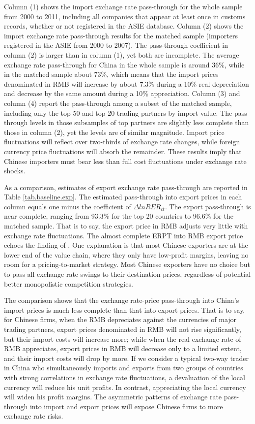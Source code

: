 Column (1) shows the import exchange rate pass-through for the whole sample from 2000 to 2011, including all companies that appear at least once in customs records, whether or not registered in the ASIE database. Column (2) shows the import exchange rate pass-through results for the matched sample (importers registered in the ASIE from 2000 to 2007). The pass-through coefficient in column (2) is larger than in column (1), yet both are incomplete. The average exchange rate pass-through for China in the whole sample is around 36\%, while in the matched sample about 73\%, which means that the import prices denominated in RMB will increase by about 7.3\% during a 10\% real depreciation and decrease by the same amount during a 10\% appreciation. Column (3) and column (4) report the pass-through among a subset of the matched sample, including only the top 50 and top 20 trading partners by import value. The pass-through levels in those subsamples of top partners are slightly less complete than those in column (2), yet the levels are of similar magnitude. Import price fluctuations will reflect over two-thirds of exchange rate changes, while foreign currency price fluctuations will absorb the remainder. These results imply that Chinese importers must bear less than full cost fluctuations under exchange rate shocks. 

As a comparison, estimates of export exchange rate pass-through are reported in Table \ref{tab.baseline.exp}. The estimated pass-through into export prices in each column equals one minus the coefficient of $\Delta lnRER_{ct}$. The export pass-through is near complete, ranging from 93.3\% for the top 20 countries to 96.6\% for the matched sample. That is to say, the export price in RMB adjusts very little with exchange rate fluctuations. The almost complete ERPT into RMB export price echoes the finding of \cite{lmx2015}. One explanation is that most Chinese exporters are at the lower end of the value chain, where they only have low-profit margins, leaving no room for a pricing-to-market strategy. Most Chinese exporters have no choice but to pass all exchange rate swings to their destination prices, regardless of potential better monopolistic competition strategies.

The comparison shows that the exchange rate-price pass-through into China's import prices is much less complete than that into export prices. That is to say, for Chinese firms, when the RMB depreciates against the currencies of major trading partners, export prices denominated in RMB will not rise significantly, but their import costs will increase more; while when the real exchange rate of RMB appreciates, export prices in RMB will decrease only to a limited extent, and their import costs will drop by more. If we consider a typical two-way trader in China who simultaneously imports and exports from two groups of countries with strong correlations in exchange rate fluctuations, a devaluation of the local currency will reduce his unit profits. In contrast, appreciating the local currency will widen his profit margins. The asymmetric patterns of exchange rate pass-through into import and export prices will expose Chinese firms to more exchange rate risks.

